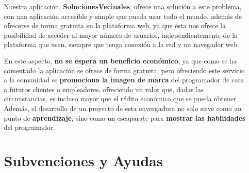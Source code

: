 Nuestra aplicación, \textbf{SolucionesVecinales}, ofrece una solución a este problema, con una aplicación accesible y simple que pueda usar todo el mundo, además de ofrecerse de forma gratuita en la plataforma web, ya que ésta nos ofrece la posibilidad de acceder al mayor número de usuarios, independientemente de la plataforma que usen, siempre que tenga conexión a la red y un navegador web.

En este aspecto, \textbf{no se espera un beneficio económico}, ya que como se ha comentado la aplicación se ofrece de forma gratuita, pero ofreciendo este servicio a la comunidad se \textbf{promociona la imagen de marca} del programador de cara a futuros clientes o empleadores, ofreciendo un valor que, dadas las circunstancias, es incluso mayor que el rédito económico que se pueda obtener. Además, el desarrollo de un proyecto de esta envergadura no solo sirve como un punto de \textbf{aprendizaje}, sino como un escaparate para \textbf{mostrar las habilidades} del programador.

\section{Subvenciones y Ayudas}



%

